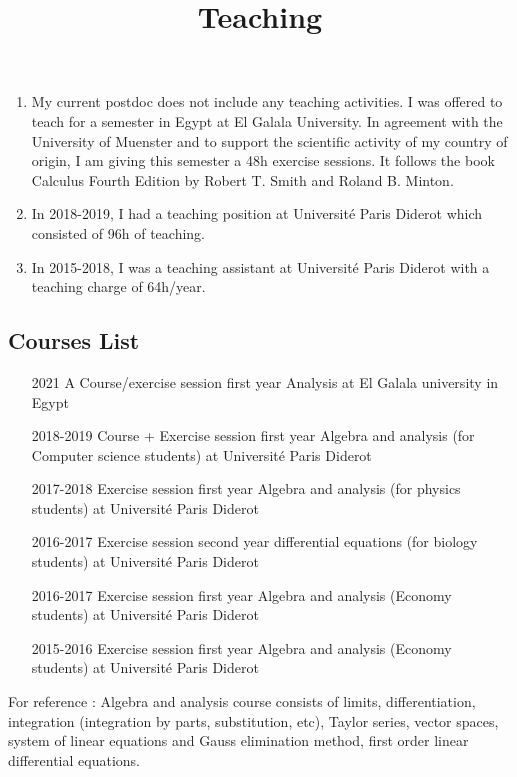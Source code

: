 \documentclass[a4paper, 13pt]{article}
\begin{document}
\title{Teaching}
\date{}
\maketitle
\begin{enumerate}
	\item My current postdoc does not include any teaching activities. I was offered to teach for a semester in Egypt at El Galala University. In agreement with the University of Muenster and to support the scientific activity of my country of origin, I am giving this semester a 48h exercise sessions. It follows the book Calculus Fourth Edition by Robert T. Smith and Roland B. Minton.
	\item In 2018-2019, I had a teaching position at Université Paris Diderot which consisted of 96h of teaching.
	\item In 2015-2018, I was a teaching assistant at Université Paris Diderot with a teaching charge of 64h/year.
\end{enumerate}
\subsection*{Courses List}
\begin{enumerate}

 \item[2021]A Course/exercise session first year Analysis at El Galala university in Egypt
	\item[2018-2019] Course + Exercise session first year Algebra and analysis (for Computer science students) at Université Paris Diderot	
	\item[2017-2018] Exercise session first year Algebra and analysis (for physics students) at Université Paris Diderot
	\item[2016-2017] Exercise session second year differential equations (for biology students) at Université Paris Diderot
	\item[2016-2017] Exercise session first year Algebra and analysis (Economy students) at Université Paris Diderot
	\item[2015-2016] Exercise session first year Algebra and analysis (Economy students) at Université Paris Diderot
\end{enumerate} 
For reference : Algebra and analysis course consists of limits, differentiation, integration (integration by parts, substitution, etc), Taylor series, vector spaces, system of linear equations and Gauss elimination method, first order linear differential equations.
\end{document}
